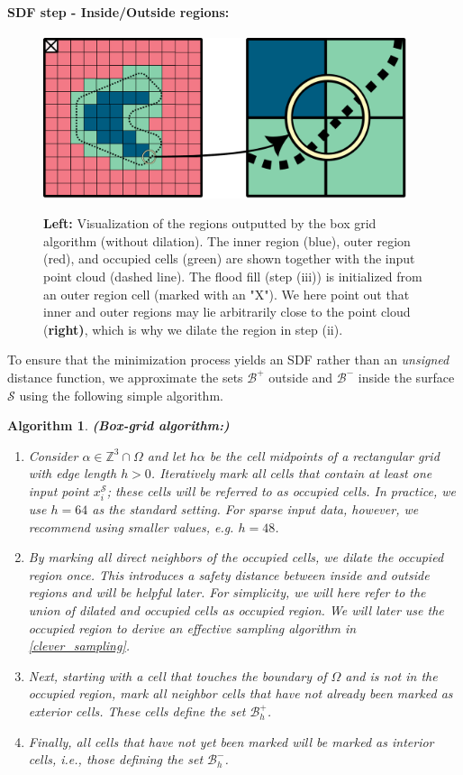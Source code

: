 \documentclass[12pt,openany]{book}
\def\S{\mathcal{S}}
\theoremstyle{plainnormal}
\newtheorem{algorithm}[theorem]{Algorithm}
\theoremstyle{remark}
\begin{document}
\paragraph{SDF step - Inside/Outside regions:}
\begin{figure}[!b]
    \centering
    \includegraphics[width = 0.95\textwidth]{Figures/InnerOuter.pdf}\label{InnerOuter}
    \caption{\textbf{Left:} Visualization of the regions outputted by the box grid algorithm (without dilation). The inner region (blue), outer region (red), and occupied cells (green) are shown together with the input point cloud (dashed line). The flood fill (step (iii)) is initialized from an outer region cell (marked with an "X"). We here point out that inner and outer regions may lie arbitrarily close to the point cloud (\textbf{right)}, which is why we dilate the region in step (ii).
}
\end{figure}
To ensure that the minimization process yields an SDF rather than an \emph{unsigned} distance function, we approximate the sets $\mathcal{B}^+$ outside and $\mathcal{B}^-$ inside the surface $\mathcal{S}$ using the following simple algorithm.
\begin{algorithm}\textbf{(Box-grid algorithm:)}\label{box_algorithm}
\begin{enumerate}
    \item Consider $\alpha \in \mathbb{Z}^3\cap\Omega$ and let $h\alpha $ be the cell midpoints of a rectangular grid with edge length $h > 0$. Iteratively mark all cells that contain at least one input point $x_i^\S$; these cells will be referred to as \emph{occupied cells}. In practice, we use $h = 64$ as the standard setting. For sparse input data, however, we recommend using smaller values, e.g. $h = 48$.
    \item By marking all direct neighbors of the occupied cells, we dilate the occupied region once. This introduces a safety distance between inside and outside regions and will be helpful later. For simplicity, we will here refer to the union of dilated and occupied cells as \emph{occupied region}. We will later use the occupied region to derive an effective sampling algorithm in \ref{clever_sampling}.
    \item Next, starting with a cell that touches the boundary of $\Omega$ and is not in the occupied region, mark all neighbor cells that have not already been marked as \emph{exterior cells}. These cells define the set $\mathcal{B}^+_h$.
    \item Finally, all cells that have not yet been marked will be marked as \emph{interior cells}, i.e., those defining the set $\mathcal{B}_h^-$.
    \end{enumerate}
\end{algorithm}
\end{document}
